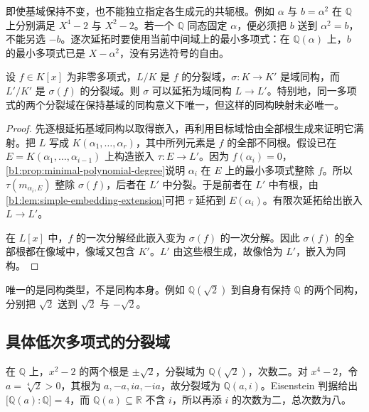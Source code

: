 \ProseParagraphBreak
即使基域保持不变，也不能独立指定各生成元的共轭根。例如 \(\alpha\) 与 \(b=\alpha^2\) 在 \(\mathbb Q\) 上分别满足 \(X^4-2\) 与 \(X^2-2\)。若一个 \(\mathbb Q\) 同态固定 \(\alpha\)，便必须把 \(b\) 送到 \(\alpha^2=b\)，不能另选 \(-b\)。逐次延拓时要使用当前中间域上的最小多项式：在 \(\mathbb Q(\alpha)\) 上，\(b\) 的最小多项式已是 \(X-\alpha^2\)，没有另选符号的自由。

\begin{proposition}\label{b1:prop:splitting-field-unique}
	设 \(f\in K[x]\) 为非零多项式，\(L/K\) 是 \(f\) 的分裂域，\(\sigma:K\rightarrow K'\) 是域同构，而 \(L'/K'\) 是 \(\sigma(f)\) 的分裂域。则 \(\sigma\) 可以延拓为域同构 \(L\rightarrow L'\)。特别地，同一多项式的两个分裂域在保持基域的同构意义下唯一，但这样的同构映射未必唯一。
\end{proposition}
\begin{proof}
	先逐根延拓基域同构以取得嵌入，再利用目标域恰由全部根生成来证明它满射。把 \(L\) 写成 \(K(\alpha_1,\ldots,\alpha_r)\)，其中所列元素是 \(f\) 的全部不同根。假设已在 \(E=K(\alpha_1,\ldots,\alpha_{i-1})\) 上构造嵌入 \(\tau:E\rightarrow L'\)。因为 \(f(\alpha_i)=0\)，\cref{b1:prop:minimal-polynomial-degree}说明 \(\alpha_i\) 在 \(E\) 上的最小多项式整除 \(f\)。所以 \(\tau(m_{\alpha_i,E})\) 整除 \(\sigma(f)\)，后者在 \(L'\) 中分裂。于是前者在 \(L'\) 中有根，由\cref{b1:lem:simple-embedding-extension}可把 \(\tau\) 延拓到 \(E(\alpha_i)\)。有限次延拓给出嵌入 \(L\rightarrow L'\)。

	在 \(L[x]\) 中，\(f\) 的一次分解经此嵌入变为 \(\sigma(f)\) 的一次分解。因此 \(\sigma(f)\) 的全部根都在像域中，像域又包含 \(K'\)。\(L'\) 由这些根生成，故像恰为 \(L'\)，嵌入为同构。
\end{proof}
唯一的是同构类型，不是同构本身。例如 \(\mathbb Q(\sqrt2)\) 到自身有保持 \(\mathbb Q\) 的两个同构，分别把 \(\sqrt2\) 送到 \(\sqrt2\) 与 \(-\sqrt2\)。

\subsection{具体低次多项式的分裂域}
\label{b1:subsec:1501:03}

在 \(\mathbb Q\) 上，\(x^2-2\) 的两个根是 \(\pm\sqrt2\)，分裂域为 \(\mathbb Q(\sqrt2)\)，次数二。对 \(x^4-2\)，令 \(a=\sqrt[4]2>0\)，其根为 \(a,-a,ia,-ia\)，故分裂域为 \(\mathbb Q(a,i)\)。Eisenstein 判据给出 \(\bigl[\mathbb Q(a):\mathbb Q\bigr]=4\)，而 \(\mathbb Q(a)\subseteq\mathbb R\) 不含 \(i\)，所以再添 \(i\) 的次数为二，总次数为八。

